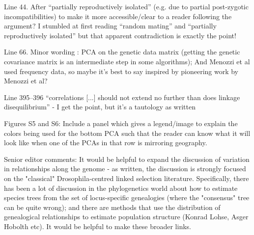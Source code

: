 \begin{point}{Line 44.}
    After ``partially reproductively isolated'' (e.g. due to partial post-zygotic incompatibilities) to make it more accessible/clear to a reader following the argument? I stumbled at first reading ``random mating'' and ``partially reproductively isolated'' but that apparent contradiction is exactly the point!
\end{point}


\begin{point}{Line 66.}
    Minor wording : PCA on the genetic data matrix (getting the genetic covariance matrix is an intermediate step in some algorithms); And Menozzi et al used frequency data, so maybe it's best to say inspired by pioneering work by Menozzi et al?
\end{point}


\begin{point}{Line 395--396} ``correlations [...] should not extend no further than does linkage disequilibrium'' - I get the point, but it's a tautology as written
\end{point}


\begin{point}{Figures S5 and S6:} 
    Include a panel which gives a legend/image to explain the colors being used for the bottom PCA such that the reader can know what it will look like when one of the PCAs in that row is mirroring geography.
\end{point}


\begin{point}{Senior editor comments:}
    It would be helpful to expand the discussion of variation in relationships
    along the genome - as written, the discussion is strongly focused on the
    "classical" Drosophila-centred linked selection literature.  Specifically,
    there has been a lot of discussion in the phylogenetics world about how to
    estimate species trees from the set of locus-specific genealogies (where the
    "consensus" tree can be quite wrong); and there are methods that use the
    distribution of genealogical relationships to estimate population structure
    (Konrad Lohse, Asger Hobolth etc).  It would be helpful to make these broader
    links.  
\end{point}

